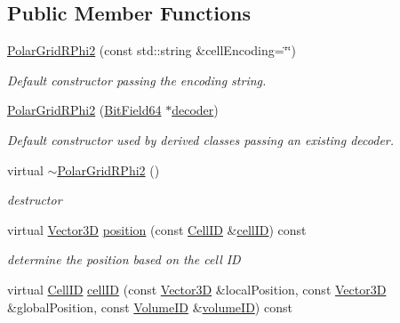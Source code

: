 \subsection*{Public Member Functions}
\begin{DoxyCompactItemize}
\item 
\hyperlink{class_d_d4hep_1_1_d_d_segmentation_1_1_polar_grid_r_phi2_a88552803b42baa290fc38268bc06f099}{Polar\+Grid\+R\+Phi2} (const std\+::string \&cell\+Encoding=\char`\"{}\char`\"{})
\begin{DoxyCompactList}\small\item\em Default constructor passing the encoding string. \end{DoxyCompactList}\item 
\hyperlink{class_d_d4hep_1_1_d_d_segmentation_1_1_polar_grid_r_phi2_ad79eed46ad54d3caf96ef51b8fd29ea7}{Polar\+Grid\+R\+Phi2} (\hyperlink{class_d_d4hep_1_1_d_d_segmentation_1_1_bit_field64}{Bit\+Field64} $\ast$\hyperlink{class_d_d4hep_1_1_d_d_segmentation_1_1_segmentation_abec3489982d0fe91ef4b142d9d755576}{decoder})
\begin{DoxyCompactList}\small\item\em Default constructor used by derived classes passing an existing decoder. \end{DoxyCompactList}\item 
virtual \hyperlink{class_d_d4hep_1_1_d_d_segmentation_1_1_polar_grid_r_phi2_a63dc7071aea7a6fbcb5a01b35bdad59e}{$\sim$\+Polar\+Grid\+R\+Phi2} ()
\begin{DoxyCompactList}\small\item\em destructor \end{DoxyCompactList}\item 
virtual \hyperlink{struct_d_d4hep_1_1_d_d_segmentation_1_1_vector3_d}{Vector3D} \hyperlink{class_d_d4hep_1_1_d_d_segmentation_1_1_polar_grid_r_phi2_a53847924cad4067697490133e8024576}{position} (const \hyperlink{namespace_d_d4hep_1_1_d_d_segmentation_ac7af071d85cb48820914434a07e21ba1}{Cell\+ID} \&\hyperlink{class_d_d4hep_1_1_d_d_segmentation_1_1_polar_grid_r_phi2_a173f2b845ff7871249b2a8dcf70f3ab1}{cell\+ID}) const
\begin{DoxyCompactList}\small\item\em determine the position based on the cell ID \end{DoxyCompactList}\item 
virtual \hyperlink{namespace_d_d4hep_1_1_d_d_segmentation_ac7af071d85cb48820914434a07e21ba1}{Cell\+ID} \hyperlink{class_d_d4hep_1_1_d_d_segmentation_1_1_polar_grid_r_phi2_a173f2b845ff7871249b2a8dcf70f3ab1}{cell\+ID} (const \hyperlink{struct_d_d4hep_1_1_d_d_segmentation_1_1_vector3_d}{Vector3D} \&local\+Position, const \hyperlink{struct_d_d4hep_1_1_d_d_segmentation_1_1_vector3_d}{Vector3D} \&global\+Position, const \hyperlink{namespace_d_d4hep_1_1_d_d_segmentation_a61a6833a18d1800bdef176595f83e3ba}{Volume\+ID} \&\hyperlink{class_d_d4hep_1_1_d_d_segmentation_1_1_segmentation_a43c0e9648e3b7cded015847c0802f757}{volume\+ID}) const

\end{DoxyCompactItemize}
